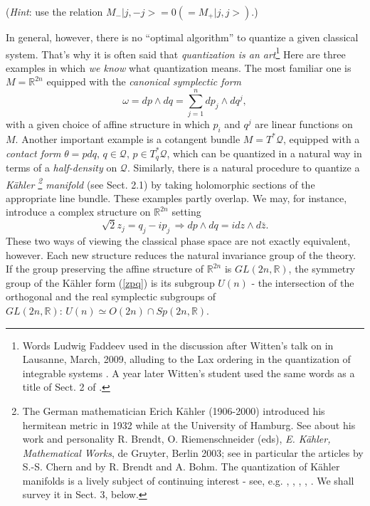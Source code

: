 \documentclass[12pt]{article}
\begin{document}
({\it Hint}: use the relation $M_- |j, -j> = 0 (= M_+|j, j>)$.)

In general, however, there is no ``optimal algorithm'' to quantize a given
classical system. That's why it is often said that {\it quantization is an art}\footnote{Words Ludwig Faddeev used in the discussion after Witten's talk on \cite{GW} in Lausanne, March, 2009, alluding to the Lax ordering in the quantization of integrable systems \cite{F}. A year later Witten's student used the same words as a title of Sect. 2 of \cite{G10}.} Here are three examples in which {\it we know}
what quantization means. The most familiar one is $M = {\mathbb R}^{2n}$
equipped with the {\it canonical symplectic form}
\begin{equation}
\label{dpdq}
\omega = dp\wedge dq = \sum_{j=1}^n dp_j\wedge dq^j,
\end{equation}
with a given choice of affine structure in which $p_i$ and $q^j$ are linear
functions on $M$. Another important example is a cotangent bundle $M = 
T^*{\mathcal Q}$, equipped with a {\it contact form} $\theta = p dq, \, 
q\in{\mathcal Q}, \, p\in T^*_q {\mathcal Q}$, which can be quantized in a natural
 way in terms of a {\it half-density} on ${\mathcal Q}$. Similarly, there is a 
natural procedure to quantize a {\it K\"ahler \footnote{The German mathematician Erich
 K\"ahler (1906-2000) introduced his hermitean metric in 1932 while at the 
University of Hamburg. See about his work and personality R. Brendt, O. 
Riemenschneider (eds), {\it E. K\"ahler, Mathematical Works}, de Gruyter, Berlin
2003; see in particular the articles by S.-S. Chern and by R. Brendt and A.
Bohm. The quantization of K\"ahler manifolds is a lively subject of
continuing interest - see, e.g. \cite{AdPW}, \cite{Hi}, \cite{GW}, \cite{W10},
\cite{G10}. We shall survey it in Sect. 3, below.} manifold} (see Sect. 2.1) 
by taking holomorphic sections of the appropriate line 
bundle. These examples partly overlap. We may, for instance, introduce a 
complex structure on ${\mathbb R}^{2n}$ setting
\begin{equation}
\label{zpq}
\sqrt{2} z_j = q_j - i p_j \, \Rightarrow dp\wedge dq = i dz\wedge d{\bar z}.
\end{equation}
These two ways of viewing the classical phase space are not exactly equivalent,
 however. Each new structure reduces the natural invariance group of the theory.
 If the group preserving the affine structure of ${\mathbb R}^{2n}$ is $GL(2n,
{\mathbb R})$, the symmetry group of the K\"ahler form (\ref{zpq}) is its
subgroup $U(n)$ - the intersection of the orthogonal and the real symplectic 
subgroups of $GL(2n, {\mathbb R}): \, U(n)\simeq O(2n)\cap Sp(2n,{\mathbb R})$.
\end{document}
